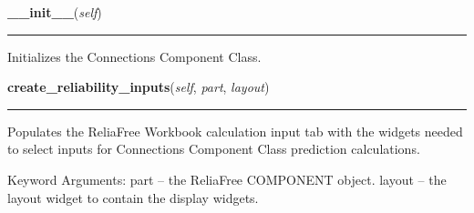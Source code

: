\hspace{.8\funcindent}\begin{boxedminipage}{\funcwidth}

    \raggedright \textbf{\_\_init\_\_}(\textit{self})

    \vspace{-1.5ex}

    \rule{\textwidth}{0.5\fboxrule}
\setlength{\parskip}{2ex}
    Initializes the Connections Component Class.

\setlength{\parskip}{1ex}
    \end{boxedminipage}

    \label{reliafree:connections:connection:Connection:create_reliability_inputs}

    \vspace{0.5ex}

\hspace{.8\funcindent}\begin{boxedminipage}{\funcwidth}

    \raggedright \textbf{create\_reliability\_inputs}(\textit{self}, \textit{part}, \textit{layout})

    \vspace{-1.5ex}

    \rule{\textwidth}{0.5\fboxrule}
\setlength{\parskip}{2ex}
    Populates the ReliaFree Workbook calculation input tab with the widgets
    needed to select inputs for Connections Component Class prediction 
    calculations.

    Keyword Arguments: part   -- the ReliaFree COMPONENT object. layout -- 
    the layout widget to contain the display widgets.

\setlength{\parskip}{1ex}
    \end{boxedminipage}

    \label{reliafree:connections:connection:Connection:create_reliability_outputs}

    \vspace{0.5ex}

